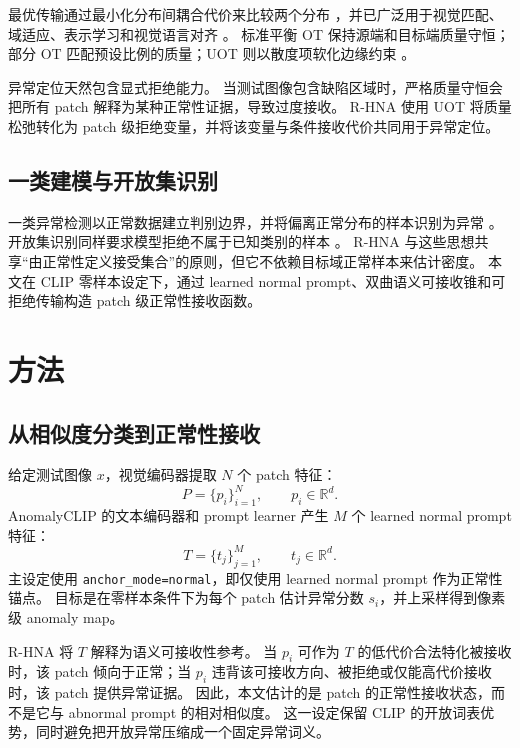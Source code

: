 \documentclass[UTF8,fontset=none,10pt]{ctexart}
\newcommand{\method}{R-HNA}
\newcommand{\clip}{\textsc{CLIP}}
\begin{document}
最优传输通过最小化分布间耦合代价来比较两个分布 \cite{OptimalTransport}，并已广泛用于视觉匹配、域适应、表示学习和视觉语言对齐 \cite{OTVision, OTVL}。
标准平衡 OT 保持源端和目标端质量守恒；部分 OT 匹配预设比例的质量；UOT 则以散度项软化边缘约束 \cite{PartialOT, UnbalancedOptimalTransport, Sinkhorn}。

异常定位天然包含显式拒绝能力。
当测试图像包含缺陷区域时，严格质量守恒会把所有 patch 解释为某种正常性证据，导致过度接收。
\method{} 使用 UOT 将质量松弛转化为 patch 级拒绝变量，并将该变量与条件接收代价共同用于异常定位。

\subsection{一类建模与开放集识别}

一类异常检测以正常数据建立判别边界，并将偏离正常分布的样本识别为异常 \cite{OneClassAD}。
开放集识别同样要求模型拒绝不属于已知类别的样本 \cite{OpenSetRecognition}。
\method{} 与这些思想共享“由正常性定义接受集合”的原则，但它不依赖目标域正常样本来估计密度。
本文在 \clip{} 零样本设定下，通过 learned normal prompt、双曲语义可接收锥和可拒绝传输构造 patch 级正常性接收函数。

\section{方法}

\subsection{从相似度分类到正常性接收}

给定测试图像 $x$，视觉编码器提取 $N$ 个 patch 特征：
\begin{equation}
    P = \{p_i\}_{i=1}^{N}, \qquad p_i \in \mathbb{R}^{d}.
\end{equation}
AnomalyCLIP 的文本编码器和 prompt learner 产生 $M$ 个 learned normal prompt 特征：
\begin{equation}
    T = \{t_j\}_{j=1}^{M}, \qquad t_j \in \mathbb{R}^{d}.
\end{equation}
主设定使用 \texttt{anchor\_mode=normal}，即仅使用 learned normal prompt 作为正常性锚点。
目标是在零样本条件下为每个 patch 估计异常分数 $s_i$，并上采样得到像素级 anomaly map。

\method{} 将 $T$ 解释为语义可接收性参考。
当 $p_i$ 可作为 $T$ 的低代价合法特化被接收时，该 patch 倾向于正常；当 $p_i$ 违背该可接收方向、被拒绝或仅能高代价接收时，该 patch 提供异常证据。
因此，本文估计的是 patch 的正常性接收状态，而不是它与 abnormal prompt 的相对相似度。
这一设定保留 \clip{} 的开放词表优势，同时避免把开放异常压缩成一个固定异常词义。
\end{document}

